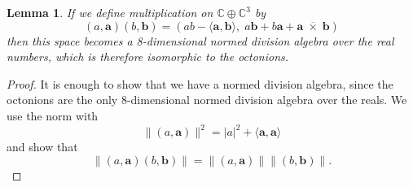 \documentclass{article}
\theoremstyle{plain}
\newtheorem{lem}[thm]{Lemma}
\theoremstyle{remark}
\theoremstyle{definition}
\newcommand{\C}{{\mathbb C}}  %
\begin{document}
\begin{lem}
\label{lem:octonions_from_complex_vectors}
If we define multiplication on $\C \oplus \C^3$ by
\[  (a , \mathbf{a})(b , \mathbf{b}) = (a b -  \langle \mathbf{a}, \mathbf{b}\rangle, \; a \mathbf{b} + b \mathbf{a} + \mathbf{a} \; \overline{\!\times\!} \; \mathbf{b}) \]
then this space becomes a 8-dimensional normed division algebra over the real numbers, which is therefore isomorphic to the octonions.
\end{lem}

\begin{proof}  It is enough to show that we have a normed division algebra, since the octonions are the only 8-dimensional normed division algebra over the reals.   We use the norm with
\[ \|(a ,\mathbf{a})\|^2 =  |a|^2 + \langle \mathbf{a} , \mathbf{a} \rangle \]
and show that
\[  \|(a, \mathbf{a})(b, \mathbf{b})\| = \|(a, \mathbf{a})\| \|(b , \mathbf{b})\| .\]


\end{proof}
\end{document}
